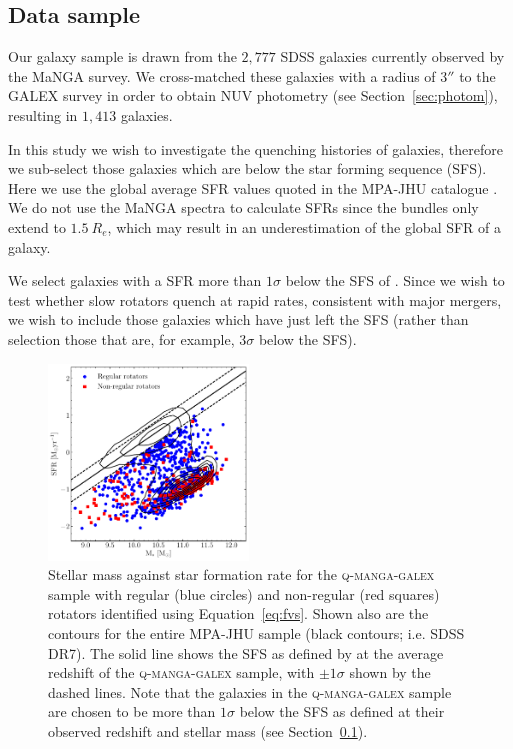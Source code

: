 \documentclass[useAMS,usenatbib]{mn2e}
\begin{document}
\subsection{Data sample}\label{sec:mangasample}

Our galaxy sample is drawn from the $2,777$ SDSS galaxies currently observed by the MaNGA survey. We cross-matched these galaxies with a radius of $3''$ to the GALEX survey in order to obtain NUV photometry (see Section~\ref{sec:photom}), resulting in $1,413$ galaxies.

In this study we wish to investigate the quenching histories of galaxies, therefore we sub-select those galaxies which are below the star forming sequence (SFS). Here we use the global average SFR values quoted in the MPA-JHU catalogue \citep[][which are corrected for aperture bias]{kauffmann03, brinchmann04}. We do not use the MaNGA spectra to calculate SFRs since the bundles only extend to $1.5~R_e$, which may result in an underestimation of the global SFR of a galaxy. 

We select galaxies with a SFR more than $1\sigma$ below the SFS of \cite{peng10}. Since we wish to test whether slow rotators quench at rapid rates, consistent with major mergers, we wish to include those galaxies which have just left the SFS (rather than selection those that are, for example, $3\sigma$ below the SFS).

\begin{figure}
\centering
\includegraphics[width=0.475\textwidth]{../figures/nonSF_FR_SR_SFS_scatter.pdf}
\caption{Stellar mass against star formation rate for the \textsc{q-manga-galex} sample with regular (blue circles) and non-regular (red squares) rotators identified using Equation~\ref{eq:fvs}. Shown also are the contours for the entire MPA-JHU sample (black contours; i.e. SDSS DR7). The solid line shows the SFS as defined by \protect\cite{peng10} at the average redshift of the \textsc{q-manga-galex} sample, with $\pm 1 \sigma$ shown by the dashed lines. Note that the galaxies in the \textsc{q-manga-galex} sample are chosen to be more than $1\sigma$ below the SFS as defined at their observed redshift and stellar mass (see Section~\protect\ref{sec:mangasample}).}
\label{fig:masvsfr}
\end{figure}
\end{document}
